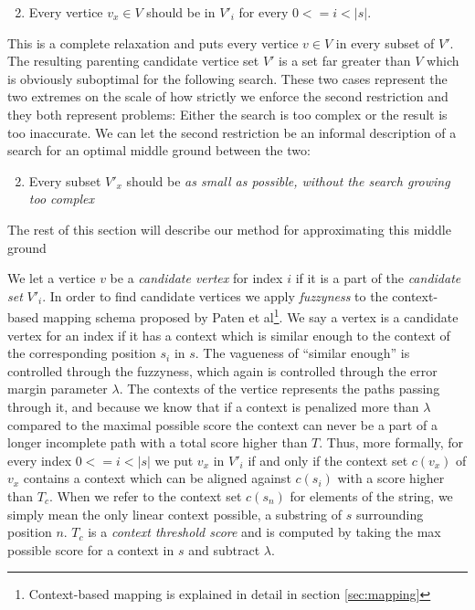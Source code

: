 \documentclass[thesis.tex]{subfiles}
\begin{document}
\begin{enumerate}
  \setcounter{enumi}{1}
  \item Every vertice $v_x \in V$ should be in $V'_i$ for every $0<=i<|s|$.
\end{enumerate}
This is a complete relaxation and puts every vertice $v \in V$ in every subset of $V'$. The resulting parenting candidate vertice set $V'$ is a set far greater than $V$ which is obviously suboptimal for the following search. These two cases represent the two extremes on the scale of how strictly we enforce the second restriction and they both represent problems: Either the search is too complex or the result is too inaccurate. We can let the second restriction be an informal description of a search for an optimal middle ground between the two:
\begin{enumerate}
  \setcounter{enumi}{1}
  \item Every subset $V'_x$ should be \textit{as small as possible, without the search growing too complex}
\end{enumerate}
The rest of this section will describe our method for approximating this middle ground\\
\par\noindent
We let a vertice $v$ be a \textit{candidate vertex} for index $i$ if it is a part of the \textit{candidate set} $V'_i$. In order to find candidate vertices we apply \textit{fuzzyness} to the context-based mapping schema proposed by Paten et al\footnote{Context-based mapping is explained in detail in section \ref{sec:mapping}}. We say a vertex is a candidate vertex for an index if it has a context which is similar enough to the context of the corresponding position $s_i$ in $s$. The vagueness of ``similar enough'' is controlled through the fuzzyness, which again is controlled through the error margin parameter $\lambda$. The contexts of the vertice represents the paths passing through it, and because we know that if a context is penalized more than $\lambda$ compared to the maximal possible score the context can never be a part of a longer incomplete path with a total score higher than $T$. Thus, more formally, for every index $0<=i<|s|$ we put $v_x$ in $V'_i$ if and only if the context set $c(v_x)$ of $v_x$ contains a context which can be aligned against $c(s_i)$ with a score higher than $T_c$. When we refer to the context set $c(s_n)$ for elements of the string, we simply mean the only linear context possible, a substring of $s$ surrounding position $n$. $T_c$ is a \textit{context threshold score} and is computed by taking the max possible score for a context in $s$ and subtract $\lambda$.\\
\end{document}
